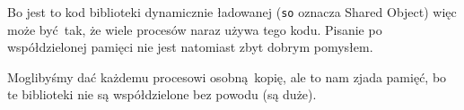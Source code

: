 Bo jest to kod biblioteki dynamicznie ładowanej (\texttt{so} oznacza Shared Object) więc może być tak, że wiele procesów naraz
używa tego kodu.
Pisanie po współdzielonej pamięci nie jest natomiast zbyt dobrym pomysłem.

Moglibyśmy dać każdemu procesowi osobną kopię, ale to nam zjada pamięć, bo te biblioteki nie są współdzielone bez powodu (są duże).